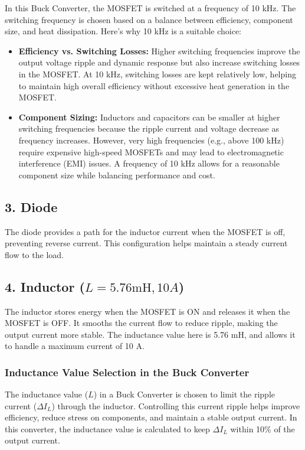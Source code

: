 \documentclass[12pt]{article}
\begin{document}
In this Buck Converter, the MOSFET is switched at a frequency of 10 kHz. The switching frequency is chosen based on a balance between efficiency, component size, and heat dissipation. Here’s why 10 kHz is a suitable choice:

\begin{itemize}
    \item \textbf{Efficiency vs. Switching Losses:} Higher switching frequencies improve the output voltage ripple and dynamic response but also increase switching losses in the MOSFET. At 10 kHz, switching losses are kept relatively low, helping to maintain high overall efficiency without excessive heat generation in the MOSFET.
    \item \textbf{Component Sizing:} Inductors and capacitors can be smaller at higher switching frequencies because the ripple current and voltage decrease as frequency increases. However, very high frequencies (e.g., above 100 kHz) require expensive high-speed MOSFETs and may lead to electromagnetic interference (EMI) issues. A frequency of 10 kHz allows for a reasonable component size while balancing performance and cost.
\end{itemize}

\subsection*{3. Diode}
The diode provides a path for the inductor current when the MOSFET is off, preventing reverse current. This configuration helps maintain a steady current flow to the load.

\subsection*{4. Inductor (\(L = 5.76\text{mH}, 10A\))}
The inductor stores energy when the MOSFET is ON and releases it when the MOSFET is OFF. It smooths the current flow to reduce ripple, making the output current more stable. The inductance value here is 5.76 mH, and allows it to handle a maximum current of 10 A.

\subsubsection*{Inductance Value Selection in the Buck Converter}
The inductance value (\(L\)) in a Buck Converter is chosen to limit the ripple current (\(\Delta I_L\)) through the inductor. Controlling this current ripple helps improve efficiency, reduce stress on components, and maintain a stable output current. In this converter, the inductance value is calculated to keep \(\Delta I_L\) within 10\% of the output current.
\end{document}
